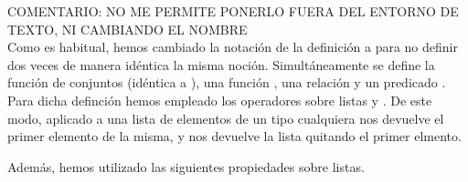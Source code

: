 \begin{isabellebody}
\begin{isamarkuptext}

COMENTARIO: NO ME PERMITE PONERLO FUERA DEL ENTORNO DE TEXTO, NI CAMBIANDO EL NOMBRE \\

Como es habitual, hemos cambiado la notación de la definición a  para no 
  definir dos veces de manera idéntica la misma noción. Simultáneamente se define la función
  de conjuntos  (idéntica a ), una función , una relación
   y un predicado . Para dicha definción hemos empleado los operadores
  sobre listas  y .
  De este modo,  aplicado a una lista de elementos de un tipo cualquiera  nos 
  devuelve el primer elemento de la misma, y   nos 
  devuelve la lista quitando el primer elmento.
 
  Además, hemos utilizado las siguientes propiedades sobre listas.


\end{isamarkuptext}
\end{isabellebody}
